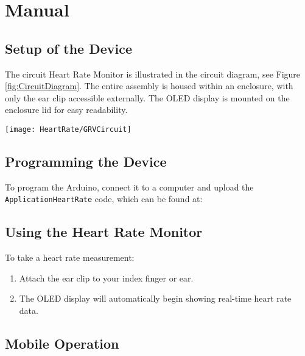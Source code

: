 

\section{Manual}

\subsection{Setup of the Device}

The circuit Heart Rate Monitor is illustrated in the circuit diagram, see Figure \ref{fig:CircuitDiagram}. The entire assembly is housed within an enclosure, with only the ear clip accessible externally. The OLED display is mounted on the enclosure lid for easy readability.

    \begin{center}
        \texttt{[image: HeartRate/GRVCircuit]}
        \label{fig:CircuitDiagram}
    \end{center}


\subsection{Programming the Device}

To program the Arduino, connect it to a computer and upload the \texttt{ApplicationHeartRate} code, which can be found at:

{
	
  

}

\subsection{Using the Heart Rate Monitor}

To take a heart rate measurement:

\begin{enumerate}
    \item Attach the ear clip to your index finger or ear.
    \item The OLED display will automatically begin showing real-time heart rate data.
\end{enumerate}


\subsection{Mobile Operation}


